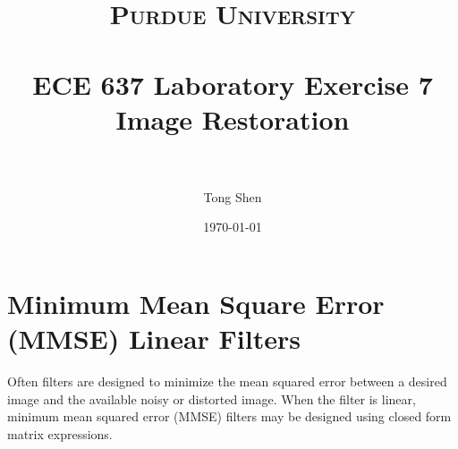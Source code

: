 \documentclass[paper=a4, fontsize=11pt]{scrartcl} %
\title{	
\normalfont \normalsize 
\textsc{Purdue University} \\ [25pt] %
\horrule{0.5pt} \\[0.4cm] %
\huge ECE 637 Laboratory Exercise 7 \\ 
\huge Image Restoration\\%
\horrule{2pt} \\[0.5cm] %
}
\author{Tong Shen} %
\date{\normalsize\today} %
\numberwithin{equation}{section} %
\numberwithin{figure}{section} %
\numberwithin{table}{section} %
\begin{document}
\maketitle %

\section{Minimum Mean Square Error (MMSE) Linear Filters
}

Often filters are designed to minimize the mean squared error between a desired image and
the available noisy or distorted image. When the filter is linear, minimum mean squared
error (MMSE) filters may be designed using closed form matrix expressions.
\vspace{10in}
\\
\end{document}
